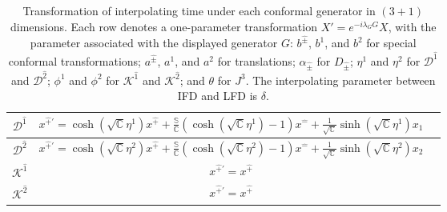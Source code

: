 \documentclass[foundations,article,submit,pdftex,moreauthors]{Definitions/mdpi}
\begin{document}
\begin{table}[h!]
{\begin{tabular}{|c||c|c|}
              \hline
               \rule{0pt}{16pt} $\mathcal{D}^{\hat{1}}$ &  $ x^{\hat{+}\prime}=\cosh{(\sqrt{\mathbb{C}}\eta^{1})}x^{\hat{+}}+\frac{\mathbb{S}}{\mathbb{C}}\left(\cosh{(\sqrt{\mathbb{C}}\eta^{1})}-1\right)x^{\hat{-}}+\frac{1}{\sqrt{\mathbb{C}}}\sinh{(\sqrt{\mathbb{C}}\eta^{1})}x_{{1}}$ \\
               \hline
               \rule{0pt}{16pt} $\mathcal{D}^{\hat{2}}$ & $ x^{\hat{+}\prime}=\cosh{(\sqrt{\mathbb{C}}\eta^{2})}x^{\hat{+}}+\frac{\mathbb{S}}{\mathbb{C}}\left(\cosh{(\sqrt{\mathbb{C}}\eta^{2})}-1\right)x^{\hat{-}}+\frac{1}{\sqrt{\mathbb{C}}}\sinh{(\sqrt{\mathbb{C}}\eta^{2})}x_{{2}}$ \\
               \hline
               \rule{0pt}{16pt} $\mathcal{K}^{\hat{1}}$ & $ x^{\hat{+}\prime}=x^{\hat{+}}$ \\
               \hline
               \rule{0pt}{16pt} $\mathcal{K}^{\hat{2}}$ & $ x^{\hat{+}\prime}=x^{\hat{+}}$ \\
               \hline
        \end{tabular}}
        \caption{Transformation of interpolating time under each conformal generator in $(3+1)$ dimensions. Each row denotes a one-parameter transformation $X'=e^{-i\lambda_G G}X$, with the parameter associated with the displayed generator $G$: $b^{\hat{\pm}}$, $b^1$, and $b^2$ for special conformal transformations; $a^{\hat{\pm}}$, $a^1$, and $a^2$ for translations; $\alpha_{\hat{\pm}}$ for $D_{\hat{\pm}}$; $\eta^1$ and $\eta^2$ for $\mathcal{D}^{\hat{1}}$ and $\mathcal{D}^{\hat{2}}$; $\phi^1$ and $\phi^2$ for $\mathcal{K}^{\hat{1}}$ and $\mathcal{K}^{\hat{2}}$; and $\theta$ for $J^3$. The interpolating parameter between IFD and LFD is $\delta$.}
        \label{tablexprime}
    \end{table}
\FloatBarrier
\end{document}

